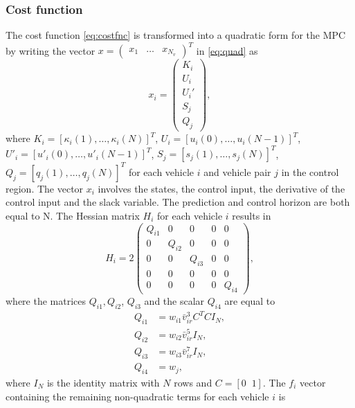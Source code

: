 \documentclass[letterpaper,10pt,conference]{ieeeconf}
\begin{document}
\subsubsection{Cost function}
The cost function \eqref{eq:costfnc} is transformed into a quadratic form for the MPC by writing the vector $x=\begin{pmatrix}x_1&\dots&x_{N_v}  \end{pmatrix}^T$ in \eqref{eq:quad} as
\begin{equation}
x_i=\begin{pmatrix}
K_i \\ U_i\\ U_i' \\ S_j \\ Q_j
\end{pmatrix},
\end{equation}
where $K_i=[\kappa_i(1),\ldots,\kappa_i(N)]^T$, $U_i=[u_i(0),\ldots,u_i(N-1)]^T$, $U'_i=[u'_i(0),\ldots,u'_i(N-1)]^T$, $S_j=[s_j(1),\ldots,s_j(N)]^T$, $Q_j=[q_j(1),\ldots,q_j(N)]^T$ for each vehicle $i$ and vehicle pair $j$ in the control region.
The vector $x_i$ involves the states, the control input, the derivative of the control input and the slack variable. The prediction and control horizon are both equal to N. The Hessian matrix $H_i$ for each vehicle $i$ results in
\begin{equation}\label{eq:hessian}
H_i = 2
\begin{pmatrix}
    Q_{i1} & 0 & 0 & 0 & 0 \\
    0 & Q_{i2} & 0 & 0 & 0 \\
    0 & 0 & Q_{i3} & 0 & 0 \\
    0 & 0 & 0 & 0 & 0  \\
    0 & 0 & 0 & 0 & Q_{i4}
\end{pmatrix},
\end{equation}
where the matrices $Q_{i1}, Q_{i2}$, $Q_{i3}$ and the scalar $Q_{i4}$ are equal to
\begin{subequations}
\begin{align}
Q_{i1} &= w_{i1}\bar{v}_{ir}^3 C^TC I_N, \\
Q_{i2} &=  w_{i2}\bar{v}_{ir}^5I_N ,\\
Q_{i3} &= w_{i3}\bar{v}_{ir}^7I_N, \\
Q_{i4} &= w_j,
\end{align}
\end{subequations}
where $I_N$ is the identity matrix with $N$ rows and $C=[0 \;\; 1]$.
The $f_i$ vector containing the remaining non-quadratic terms for each vehicle $i$ is
\end{document}

